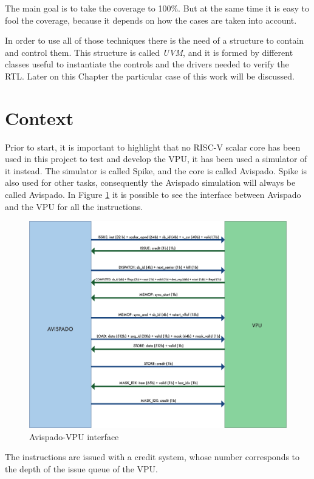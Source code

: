 The main goal is to take the coverage to 100\%. But at the same time it is easy to fool the coverage, because it depends on how the cases are taken into account.

In order to use all of those techniques there is the need of a structure to contain and control them.
This structure is called \textit{UVM}, and it is formed by different classes useful to instantiate the controls and the drivers needed to verify the RTL. Later on this Chapter the particular case of this work will be discussed.

\section{Context}
Prior to start, it is important to highlight that no RISC-V scalar core has been used in this project to test and develop the VPU, it has been used a simulator of it instead. The simulator is called Spike, and the core is called Avispado. Spike is also used for other tasks, consequently the Avispado simulation will always be called Avispado.
In Figure \ref{avi-vpu} it is possible to see the interface between Avispado and the VPU for all the instructions.

\begin{figure}[H]
    \centering
    \includegraphics[scale = 0.6]{Chapter_1/img/avi-vpu.png}
    \caption{Avispado-VPU interface}
    \label{avi-vpu}
\end{figure}


The instructions are issued with a credit system, whose number corresponds to the  depth of the issue queue of the VPU.



